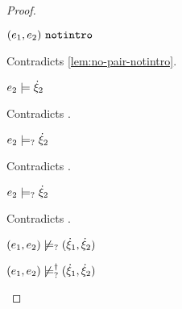 \begin{proof}
\begin{byCases}
\begin{byCases}
\begin{byCases}
\begin{byCases}
                \begin{pfsteps*}
                \item $(e_1 , e_2) ~\mathtt{notintro}$ 
                \end{pfsteps*}
                Contradicts \autoref{lem:no-pair-notintro}.
            \item[\text{(\ref{rule:CMSPair1})}]
                \begin{pfsteps*}
                \item $e_2 \models \dot{\xi}_2$ 
                \end{pfsteps*}
                Contradicts .
            \item[\text{(\ref{rule:CMSPair2})}]
                \begin{pfsteps*}
                \item $e_2 \models_{?} \dot{\xi}_2$ 
                \end{pfsteps*}
                Contradicts .
            \item[\text{(\ref{rule:CMSPair3})}]
                \begin{pfsteps*}
                \item $e_2 \models_{?} \dot{\xi}_2$ 
                \end{pfsteps*}
                Contradicts .
            \end{byCases}
            \begin{pfsteps*}
            \item $(e_1 , e_2) \not\models_{?} (\dot{\xi}_1 , \dot{\xi}_2)$  
            \item $(e_1 , e_2) \not\models_{?}^{\dag} (\dot{\xi}_1 , \dot{\xi}_2)$ 
            \end{pfsteps*}
            

\end{byCases}
\end{byCases}
\end{byCases}
\end{proof}
